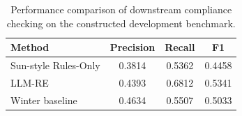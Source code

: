\begin{table}[t]
\centering
\caption{Performance comparison of downstream compliance checking on the constructed development benchmark.}
\label{tab:stage3}
\begin{tabular}{lccc}
\hline
Method & Precision & Recall & F1 \\
\hline
Sun-style Rules-Only & 0.3814 & 0.5362 & 0.4458 \\
LLM-RE & 0.4393 & 0.6812 & 0.5341 \\
Winter baseline & 0.4634 & 0.5507 & 0.5033 \\
\hline
\end{tabular}
\end{table}
